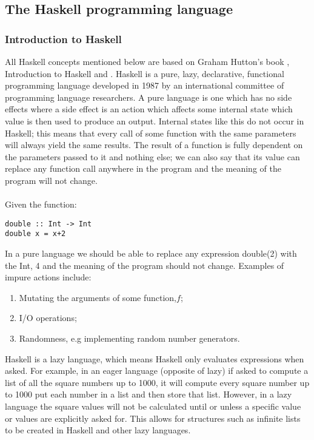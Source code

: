 \documentclass{article}%
\begin{document}
\subsection{The Haskell programming language}
\subsubsection{Introduction to Haskell}
All Haskell concepts mentioned below are based on Graham Hutton’s book \cite{hutton_2007}, Introduction to Haskell and \cite{learnyouahaskell}. Haskell is a pure, lazy, declarative, functional programming language developed in 1987 by an international committee of programming language researchers. A pure language is one which has no side effects where a side effect is an action which affects some internal state which value is then used to produce an output. Internal states like this do not occur in Haskell; this means that every call of some function with the same parameters will always yield the same results. The result of a function is fully dependent on the parameters passed to it and nothing else; we can also say that its value can replace any function call anywhere in the program and the meaning of the program will not change. \\\\
Given the function:\\
\begin{verbatim}
double :: Int -> Int 
double x = x+2
\end{verbatim}
In a pure language we should be able to replace any expression double(2) with the Int, 4 and the meaning of the program should not change. 
Examples of impure actions include: 
\begin{enumerate}
\item Mutating the arguments of some function,$f$;
\item I/O operations;
\item Randomness, e.g implementing random number generators. 
\end{enumerate}
Haskell is a lazy language, which means Haskell only evaluates expressions when asked. For example, in an eager language (opposite of lazy) if asked to compute a list of all the square numbers up to 1000, it will compute every square number up to 1000 put each number in a list and then store that list. However, in a lazy language the square values will not be calculated until or unless a specific value or values are explicitly asked for. This allows for structures such as infinite lists to be created in Haskell and other lazy languages.\\\\
\end{document}
